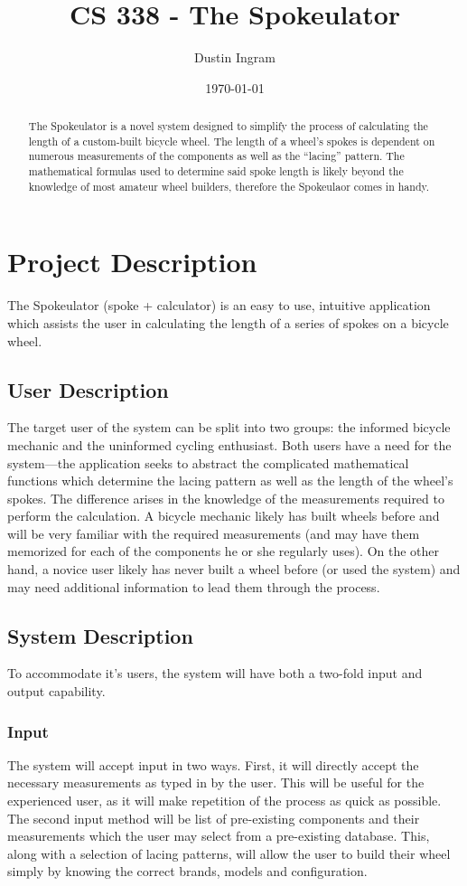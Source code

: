 \documentclass[11pt,a4paper]{article}
\title{CS 338 - The Spokeulator}
\author{Dustin Ingram}
\date{\today}
\begin{document}
	\maketitle
	\begin{abstract}
	The Spokeulator is a novel system designed to simplify the process of calculating the length of a custom-built bicycle wheel. The length of a wheel's spokes is dependent on numerous measurements of the components as well as the ``lacing'' pattern. The mathematical formulas used to determine said spoke length is likely beyond the knowledge of most amateur wheel builders, therefore the Spokeulaor comes in handy.
	\end{abstract}
	
	\section{Project Description}
  The Spokeulator (spoke + calculator) is an easy to use, intuitive application which assists the user in calculating the length of a series of spokes on a bicycle wheel.

    \subsection{User Description}
    The target user of the system can be split into two groups: the informed bicycle mechanic and the uninformed cycling enthusiast. Both users have a need for the system---the application seeks to abstract the complicated mathematical functions which determine the lacing pattern as well as the length of the wheel's spokes. The difference arises in the knowledge of the measurements required to perform the calculation. A bicycle mechanic likely has built wheels before and will be very familiar with the required measurements (and may have them memorized for each of the components he or she regularly uses). On the other hand, a novice user likely has never built a wheel before (or used the system) and may need additional information to lead them through the process.
  
    \subsection{System Description}
    To accommodate it's users, the system will have both a two-fold input and output capability.
    
      \subsubsection{Input}
      The system will accept input in two ways. First, it will directly accept the necessary measurements as typed in by the user. This will be useful for the experienced user, as it will make repetition of the process as quick as possible. The second input method will be list of pre-existing components and their measurements which the user may select from a pre-existing database.  This, along with a selection of lacing patterns, will allow the user to build their wheel simply by knowing the correct brands, models and configuration.
      
\end{document}
